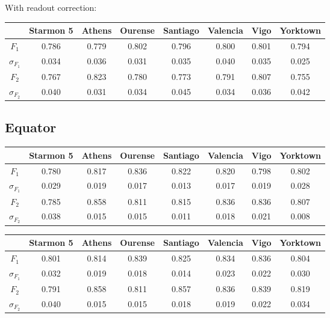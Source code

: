 With readout correction:
\begin{table}[H]
    \centering
    \begin{tabular}{|c|c|c|c|c|c|c|c|}
    \hline
    \textbf{} & \textbf{Starmon 5} & \textbf{Athens} & \textbf{Ourense} & \textbf{Santiago} & \textbf{Valencia} & \textbf{Vigo} & \textbf{Yorktown} \\ \hline
    $F_1$              & 0.786 & 0.779 & 0.802 & 0.796 & 0.800 & 0.801 & 0.794 \\ \hline
    $\sigma_{F_1}$     & 0.034 & 0.036 & 0.031 & 0.035 & 0.040 & 0.035 & 0.025 \\ \hline
    $F_2$              & 0.767 & 0.823 & 0.780 & 0.773 & 0.791 & 0.807 & 0.755 \\ \hline
    $\sigma_{F_2}$     & 0.040 & 0.031 & 0.034 & 0.045 & 0.034 & 0.036 & 0.042 \\ \hline
    \end{tabular}
\end{table}
\subsection{Equator}

\begin{table}[H]
    \centering
    \begin{tabular}{|c|c|c|c|c|c|c|c|}
    \hline
    \textbf{} & \textbf{Starmon 5} & \textbf{Athens} & \textbf{Ourense} & \textbf{Santiago} & \textbf{Valencia} & \textbf{Vigo} & \textbf{Yorktown} \\ \hline
    $F_1$              & 0.780 & 0.817 & 0.836 & 0.822 & 0.820 & 0.798 & 0.802 \\ \hline
    $\sigma_{F_1}$     & 0.029 & 0.019 & 0.017 & 0.013 & 0.017 & 0.019 & 0.028 \\ \hline
    $F_2$              & 0.785 & 0.858 & 0.811 & 0.815 & 0.836 & 0.836 & 0.807 \\ \hline
    $\sigma_{F_2}$     & 0.038 & 0.015 & 0.015 & 0.011 & 0.018 & 0.021 & 0.008 \\ \hline
    \end{tabular}
\end{table}

\begin{table}[H]
    \centering
    \begin{tabular}{|c|c|c|c|c|c|c|c|}
    \hline
    \textbf{} & \textbf{Starmon 5} & \textbf{Athens} & \textbf{Ourense} & \textbf{Santiago} & \textbf{Valencia} & \textbf{Vigo} & \textbf{Yorktown} \\ \hline
    $F_1$              & 0.801 & 0.814 & 0.839 & 0.825 & 0.834 & 0.836 & 0.804 \\ \hline
    $\sigma_{F_1}$     & 0.032 & 0.019 & 0.018 & 0.014 & 0.023 & 0.022 & 0.030 \\ \hline
    $F_2$              & 0.791 & 0.858 & 0.811 & 0.857 & 0.836 & 0.839 & 0.819 \\ \hline
    $\sigma_{F_2}$     & 0.040 & 0.015 & 0.015 & 0.018 & 0.019 & 0.022 & 0.034 \\ \hline
    \end{tabular}
\end{table}
